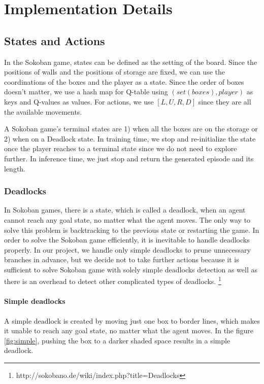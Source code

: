 \documentclass{article}
\begin{document}
\section{Implementation Details}

\subsection{States and Actions}

In the Sokoban game, states can be defined as the setting of the board. Since the positions of walls and the positions of storage are fixed, we can use the coordinations of the boxes and the player as a state. Since the order of boxes doesn't matter, we use a hash map for Q-table using $(set(boxes), player)$ as keys and Q-values as values. For actions, we use $[L, U, R, D]$ since they are all the available movements.

A Sokoban game's terminal states are 1) when all the boxes are on the storage or 2) when on a Deadlock state. In training time, we stop and re-initialize the state once the player reaches to a terminal state since we do not need to explore further. In inference time, we just stop and return the generated episode and its length.

\subsubsection{Deadlocks}

In Sokoban games, there is a state, which is called a deadlock, when an agent cannot reach any goal state, no matter what the agent moves. The only way to solve this problem is backtracking to the previous state or restarting the game. In order to solve the Sokoban game efficiently, it is inevitable to handle deadlocks properly. In our project, we handle only simple deadlocks to prune unnecessary branches in advance, but we decide not to take further actions because it is sufficient to solve Sokoban game with solely simple deadlocks detection as well as there is an overhead to detect other complicated types of deadlocks.
\footnote{http://sokobano.de/wiki/index.php?title=Deadlocks}

\paragraph{Simple deadlocks}
A simple deadlock is created by moving just one box to border lines, which makes it unable to reach any goal state, no matter what the agent moves. In the figure \ref{fig:simple}, pushing the box to a darker shaded space results in a simple deadlock.
\end{document}
